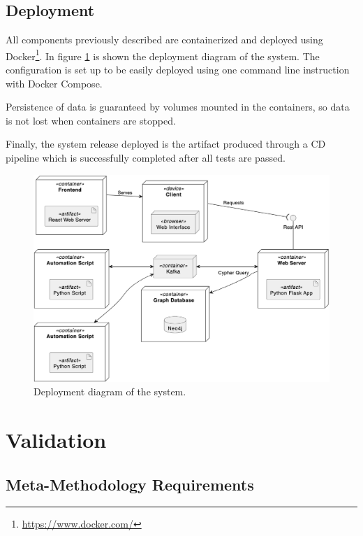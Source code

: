 \documentclass[12pt,a4paper,openright,twoside]{book}
\begin{document}
\section{Deployment}

All components previously described are containerized and deployed using Docker\footnote{\href{https://www.docker.com/}{https://www.docker.com/}}.
%
In figure \cref{fig:deployment} is shown the deployment diagram of the system.
%
The configuration is set up to be easily deployed using one command line instruction with Docker Compose.

Persistence of data is guaranteed by volumes mounted in the containers, so data is not lost when containers are stopped.

Finally, the system release deployed is the artifact produced through a \ac{CD} pipeline which is successfully completed after all tests are passed.


\begin{figure}
    \centering
    \includegraphics[width=\linewidth]{figures/diagrams/deployment.png}
    \caption{
        Deployment diagram of the system.
    }
    \label{fig:deployment}
\end{figure}


\chapter{Validation}%
\label{chap:validation}

\section{Meta-Methodology Requirements}
\end{document}
